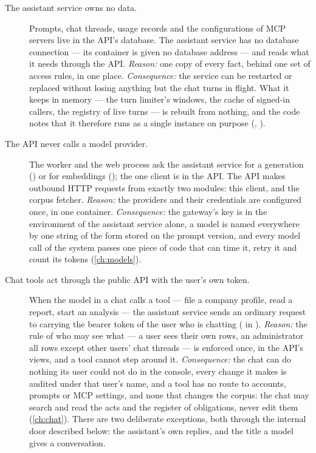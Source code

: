 \begin{description}
  \item[The assistant service owns no data.]
    Prompts, chat threads, usage records and the configurations of MCP servers live in the
    API's database. The assistant service has no database connection --- its container is
    given no database address --- and reads what it needs through the API. \emph{Reason:}
    one copy of every fact, behind one set of access rules, in one place.
    \emph{Consequence:} the service can be restarted or replaced without losing anything
    but the chat turns in flight. What it keeps in memory --- the turn limiter's windows, the
    cache of signed-in callers, the registry of live turns --- is rebuilt from nothing, and
    the code notes that it therefore runs as a single instance on purpose
    (, ).

  \item[The API never calls a model provider.]
    The worker and the web process ask the assistant service for a generation
    () or for embeddings
    (); the one client is  in the
    API. The API makes outbound HTTP requests from exactly two modules: this client, and
    the corpus fetcher. \emph{Reason:} the providers and their credentials are configured
    once, in one container. \emph{Consequence:} the gateway's key is in the environment of
    the assistant service alone, a model is named everywhere by one string of the form
     stored on the prompt version, and every model call of the system
    passes one piece of code that can time it, retry it and count its tokens
    (\cref{ch:models}).

  \item[Chat tools act through the public API with the user's own token.]
    When the model in a chat calls a tool --- file a company profile, read a report, start
    an analysis --- the assistant service sends an ordinary request to  carrying
    the bearer token of the user who is chatting ( in
    ). \emph{Reason:} the rule of who may see what --- a user sees
    their own rows, an administrator all rows except other users' chat threads --- is
    enforced once, in the API's views, and a tool cannot step around it. \emph{Consequence:}
    the chat can do nothing its user could not do in the console, every change it makes is
    audited under that user's name, and a tool has no route to accounts, prompts or MCP
    settings, and none that changes the corpus: the chat may search and read the acts and
    the register of obligations, never edit them (\cref{ch:chat}). There are two deliberate exceptions, both through the
    internal door described below: the assistant's own replies, and the title a model gives
    a conversation.


\end{description}
